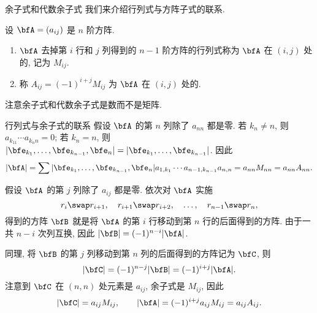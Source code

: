 \begin{frame}{余子式和代数余子式}
	\onslide<+->
	我们来介绍行列式与方阵子式的联系.
	\onslide<+->
	\begin{definition}
		设 $\bfA=(a_{ij})$ 是 $n$ 阶方阵.
		\begin{enumerate}
			\item $\bfA$ 去掉第 $i$ 行和 $j$ 列得到的 $n-1$ 阶方阵的行列式称为 $\bfA$ 在 $(i,j)$ 处的\emph{}, 记为 $M_{ij}$.
			\item 称 $A_{ij}=(-1)^{i+j}M_{ij}$ 为 $\bfA$ 在 $(i,j)$ 处的\emph{}.
		\end{enumerate}
	\end{definition}
	\onslide<+->
	注意余子式和代数余子式是数而不是矩阵.
\end{frame}


\begin{frame}{行列式与余子式的联系}
	\onslide<+->
	假设 $\bfA$ 的第 $n$ 列除了 $a_{nn}$ 都是零.
	\onslide<+->
	若 $k_n\neq n$, 则 $a_{k_11}\cdots a_{k_nn}=0$; 若 $k_n=n$, 则 $|\bfe_{k_1},\dots,\bfe_{k_{n-1}},\bfe_n|=|\bfe_{k_1},\dots,\bfe_{k_{n-1}}|$.
	\onslide<+->
	因此
	\[|\bfA|=\sum |\bfe_{k_1},\dots,\bfe_{k_{n-1}},\bfe_n|a_{1,k_1}\cdots a_{n-1,k_{n-1}}a_{n,n}=a_{nn} M_{nn}=a_{nn} A_{nn}.\]

	\onslide<+->
	假设 $\bfA$ 的第 $j$ 列除了 $a_{ij}$ 都是零.
	\onslide<+->
	依次对 $\bfA$ 实施
	\[r_i\swap r_{i+1},\quad r_{i+1}\swap r_{i+2},\quad\dots,\quad r_{n-1}\swap r_n,\]
	得到的方阵 $\bfB$ 就是将 $\bfA$ 的第 $i$ 行移动到第 $n$ 行的后面得到的方阵.
	\onslide<+->
	由于一共 $n-i$ 次列互换, 因此 $|\bfB|=(-1)^{n-i}|\bfA|$.

	\onslide<+->
	同理, 将 $\bfB$ 的第 $j$ 列移动到第 $n$ 列的后面得到的方阵记为 $\bfC$, 则
	\[|\bfC|=(-1)^{n-j}|\bfB|=(-1)^{i+j}|\bfA|.\]
	\onslide<+->
	注意到 $\bfC$ 在 $(n,n)$ 处元素是 $a_{ij}$, 余子式是 $M_{ij}$,
	\onslide<+->
	因此
	\[|\bfC|=a_{ij}M_{ij},\qquad |\bfA|=(-1)^{i+j}a_{ij}M_{ij}=a_{ij}A_{ij}.\]
\end{frame}


